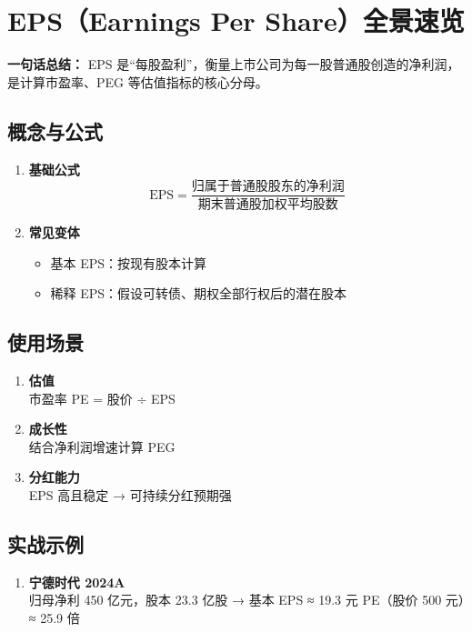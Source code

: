 \section{EPS（Earnings Per Share）全景速览}
\textbf{一句话总结：}  
{\color{red}EPS 是“每股盈利”}，衡量上市公司为每一股普通股创造的净利润，是计算市盈率、PEG 等估值指标的核心分母。

\subsection{概念与公式}
\begin{enumerate}[leftmargin=*, nosep]
    \item \textbf{基础公式}  
    {\color{red}\[
    \text{EPS} = \frac{\text{归属于普通股股东的净利润}}{\text{期末普通股加权平均股数}}
    \]
    }

    \item \textbf{常见变体}  
    \begin{itemize}[nosep]  
        \item 基本 EPS：按现有股本计算  
        \item 稀释 EPS：假设可转债、期权全部行权后的潜在股本
    \end{itemize}
\end{enumerate}

\subsection{使用场景}
\begin{enumerate}[leftmargin=*, nosep]
    \item \textbf{估值}  \\
    市盈率 PE = 股价 ÷ EPS  
    \item \textbf{成长性}  \\
    结合净利润增速计算 PEG  
    \item \textbf{分红能力}  \\
    EPS 高且稳定 → 可持续分红预期强
\end{enumerate}

\subsection{实战示例}
\begin{enumerate}[leftmargin=*, nosep]
    \item \textbf{宁德时代 2024A}  \\
    归母净利 450 亿元，股本 23.3 亿股 → 基本 EPS ≈ 19.3 元  
    PE（股价 500 元）≈ 25.9 倍
\end{enumerate}

